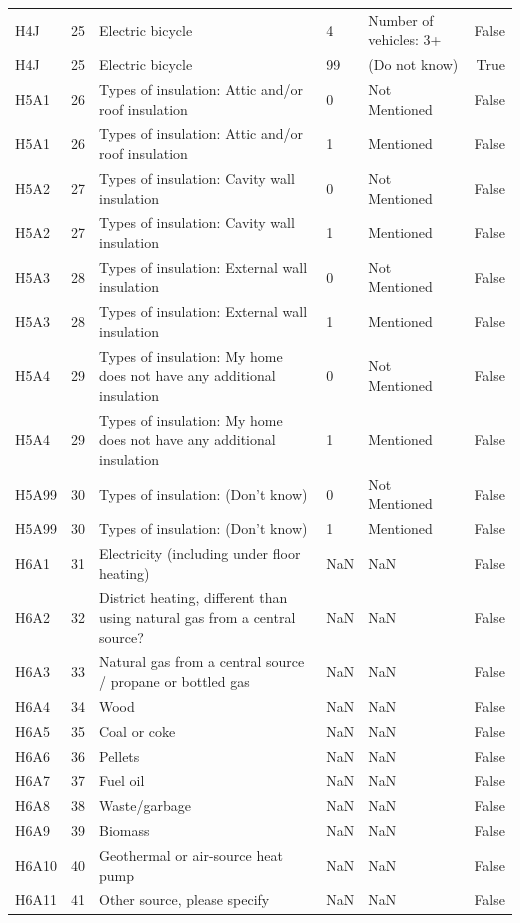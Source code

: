 \begin{tabular}{lrlllr}
H4J & 25 & Electric bicycle & 4 & Number of vehicles: 3+ & False \\
H4J & 25 & Electric bicycle & 99 & (Do not know) & True \\
H5A1 & 26 & Types of insulation: Attic and/or roof insulation & 0 & Not Mentioned & False \\
H5A1 & 26 & Types of insulation: Attic and/or roof insulation & 1 & Mentioned & False \\
H5A2 & 27 & Types of insulation: Cavity wall insulation & 0 & Not Mentioned & False \\
H5A2 & 27 & Types of insulation: Cavity wall insulation & 1 & Mentioned & False \\
H5A3 & 28 & Types of insulation: External wall insulation & 0 & Not Mentioned & False \\
H5A3 & 28 & Types of insulation: External wall insulation & 1 & Mentioned & False \\
H5A4 & 29 & Types of insulation: My home does not have any additional insulation & 0 & Not Mentioned & False \\
H5A4 & 29 & Types of insulation: My home does not have any additional insulation & 1 & Mentioned & False \\
H5A99 & 30 & Types of insulation: (Don’t know) & 0 & Not Mentioned & False \\
H5A99 & 30 & Types of insulation: (Don’t know) & 1 & Mentioned & False \\
H6A1 & 31 & Electricity (including under floor heating) & NaN & NaN & False \\
H6A2 & 32 & District heating, different than using natural gas from a central source? & NaN & NaN & False \\
H6A3 & 33 & Natural gas from a central source / propane or bottled gas & NaN & NaN & False \\
H6A4 & 34 & Wood & NaN & NaN & False \\
H6A5 & 35 & Coal or coke & NaN & NaN & False \\
H6A6 & 36 & Pellets & NaN & NaN & False \\
H6A7 & 37 & Fuel oil & NaN & NaN & False \\
H6A8 & 38 & Waste/garbage & NaN & NaN & False \\
H6A9 & 39 & Biomass & NaN & NaN & False \\
H6A10 & 40 & Geothermal or air-source heat pump & NaN & NaN & False \\
H6A11 & 41 & Other source, please specify & NaN & NaN & False \\

\end{tabular}
